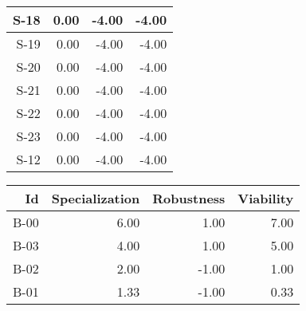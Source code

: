 \begin{tabular}{ | r | r | r | r | }
    \hline
                  S-18  &            0.00  &           -4.00  &           -4.00  \\
    \hline
                  S-19  &            0.00  &           -4.00  &           -4.00  \\
    \hline
                  S-20  &            0.00  &           -4.00  &           -4.00  \\
    \hline
                  S-21  &            0.00  &           -4.00  &           -4.00  \\
    \hline
                  S-22  &            0.00  &           -4.00  &           -4.00  \\
    \hline
                  S-23  &            0.00  &           -4.00  &           -4.00  \\
    \hline
                  S-12  &            0.00  &           -4.00  &           -4.00  \\
    \hline
\end{tabular}


\begin{tabular}{ | r | r | r | r | }
    \hline
                    Id  &  Specialization  &      Robustness  &       Viability  \\
    \hline
    \hline
                  B-00  &            6.00  &            1.00  &            7.00  \\
    \hline
                  B-03  &            4.00  &            1.00  &            5.00  \\
    \hline
                  B-02  &            2.00  &           -1.00  &            1.00  \\
    \hline
                  B-01  &            1.33  &           -1.00  &            0.33  \\
    \hline
\end{tabular}


